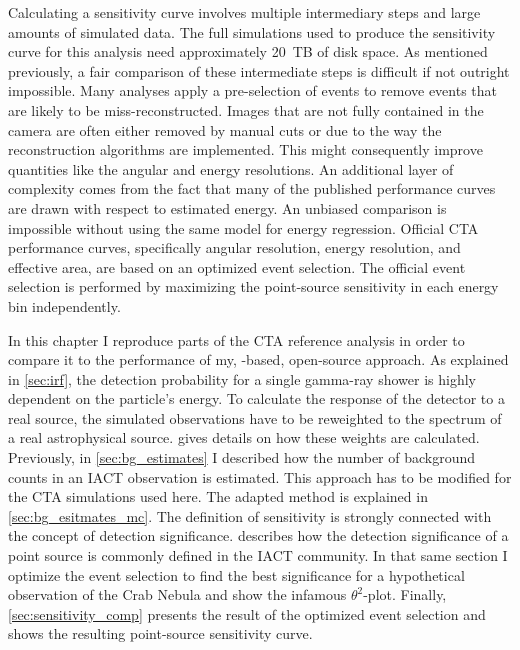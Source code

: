 Calculating a sensitivity curve involves multiple intermediary steps and large amounts of simulated data.
The full simulations used to produce the sensitivity curve for this analysis need approximately \SI{20}{TB} of disk space.
As mentioned previously, a fair comparison of these intermediate steps is difficult if not outright impossible.
Many analyses apply a pre-selection of events to remove events that are likely to be miss-reconstructed. 
Images that are not fully contained in the camera are often either removed by manual cuts or due to the way the 
reconstruction algorithms are implemented. 
This might consequently improve quantities like the angular and energy resolutions.
An additional layer of complexity comes from the fact that many of the published performance curves are drawn with respect to estimated energy.
An unbiased comparison is impossible without using the same model for energy regression. 
Official CTA performance curves, specifically angular resolution, energy resolution, and effective area, are based on an optimized 
event selection. The official event selection is performed by maximizing the point-source sensitivity in each energy bin independently. 

In this chapter I reproduce parts of the CTA reference analysis in order to compare it to the performance of my, \python-based, open-source approach.
As explained in \cref{sec:irf}, the detection probability 
for a single gamma-ray shower is highly dependent on the particle's energy. To calculate the response of the detector to a 
real source, the simulated observations have to be reweighted to the spectrum of a real astrophysical source.
 gives details on how these weights are calculated.
Previously, in \cref{sec:bg_estimates} I described how the number of background counts in an IACT observation is estimated. This approach
has to be modified for the CTA simulations used here. The adapted method is explained in \cref{sec:bg_esitmates_mc}.
The definition of sensitivity is strongly connected with the concept of detection significance.
 describes how the detection significance of a point source is commonly defined in the IACT community.
In that same section I optimize the event selection to find the best significance for a hypothetical observation of the Crab Nebula
and show the infamous $\theta^2$-plot. 
Finally, \cref{sec:sensitivity_comp} presents the result of the optimized event selection and shows the resulting point-source 
sensitivity curve.


